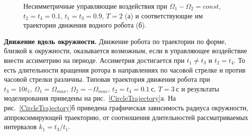 \begin{figure}[!ht]
	\begin{minipage}[h]{0.5\linewidth}
	\end{minipage}
	\hfill
	\begin{minipage}[h]{0.5\linewidth}
	\end{minipage}
	\vfill
	\begin{minipage}[h]{0.5\linewidth}
	\end{minipage}
	\hfill
	\begin{minipage}[h]{0.5\linewidth}
	\end{minipage}

	\caption{Несимметричные управляющие воздействия при $\Omega_1 - \Omega_2 = const$, $t_2 = t_4 = 0.1$, $t_1 = t_3 = 0.9$, $T = 2$ (а) и соответствующие им траектории движения водного робота (б).}
	\label{DifferentAmp}
\end{figure}

%	
%	

\textbf{Движение вдоль окружности.} Движение робота по траектории по форме, близкой к окружности, оказывается возможным, если в управляющее воздействие внести ассиметрию на периоде. Ассиметрия достигается при $t_1 \neq t_3$ и $t_2 = t_4$. То есть длительности вращения ротора в направлениях по часовой стрелке и против часовой стрелки различны. Типовая траектория движения робота при $ t_3 = 10 t_1,\, \Omega_1 = \Omega_{max},\, \Omega_2 = -\Omega_{max},\, t_2 = t_4 = 0.1~\text{с},\, T = 3~\text{с} $
и результаты моделирования приведены на рис.~\ref{CircleTrajectory}а. На рис.~\ref{CircleTrajectory}б приведена графическая зависимость радиуса окружности, аппроксимирующей траекторию, от соотношения длительностей рассматриваемых интервалов $k_1 = t_3 / t_1$. 

